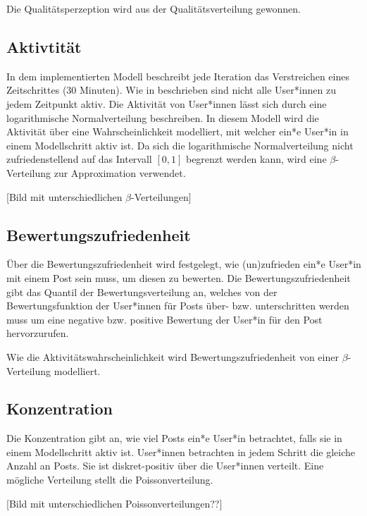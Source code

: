 Die Qualitätsperzeption wird aus der Qualitätsverteilung gewonnen.

\subsection{Aktivtität}

In dem implementierten Modell beschreibt jede Iteration das Verstreichen eines Zeitschrittes (30 Minuten). Wie in \cite{Hogg20121} beschrieben sind nicht alle User*innen zu jedem Zeitpunkt aktiv. Die Aktivität von User*innen lässt sich durch eine logarithmische Normalverteilung
beschreiben. In diesem Modell wird die Aktivität über eine Wahrscheinlichkeit modelliert,  mit welcher ein*e User*in in einem Modellschritt aktiv ist. Da sich die logarithmische Normalverteilung nicht zufriedenstellend auf das Intervall $ [0,1]$ begrenzt werden kann, wird eine $\beta$-Verteilung zur Approximation verwendet.

[Bild mit unterschiedlichen $\beta$-Verteilungen]

\subsection{Bewertungszufriedenheit}


Über die Bewertungszufriedenheit wird festgelegt, wie (un)zufrieden ein*e User*in mit einem Post sein muss, um diesen zu bewerten. 
Die Bewertungszufriedenheit gibt das Quantil der Bewertungsverteilung an, welches von der Bewertungsfunktion der User*innen für Posts über- bzw. unterschritten werden muss um eine negative bzw. positive Bewertung der User*in für den Post hervorzurufen.

Wie die Aktivitätswahrscheinlichkeit wird Bewertungszufriedenheit von einer $\beta$-Verteilung modelliert.

\subsection{Konzentration}

Die Konzentration gibt an, wie viel Posts ein*e User*in betrachtet, falls sie in einem Modellschritt aktiv ist. User*innen betrachten in jedem Schritt die gleiche Anzahl an Posts.
Sie ist diskret-positiv über die User*innen verteilt. Eine mögliche Verteilung stellt die Poissonverteilung.

[Bild mit unterschiedlichen Poissonverteilungen??]
